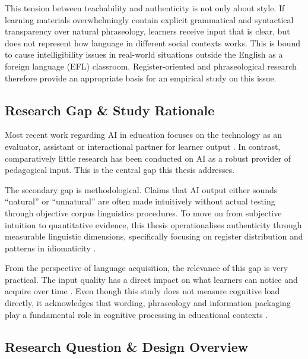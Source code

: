 \documentclass[11pt,a4paper]{article}
\begin{document}
This tension between teachability and authenticity is not only about style. If learning materials overwhelmingly contain explicit grammatical and syntactical transparency over natural phraseology, learners receive input that is clear, but does not represent how language in different social contexts works. This is bound to cause intelligibility issues in real-world situations outside the English as a foreign language (EFL) classroom. Register-oriented \parencite{biber1988variation, leFoll2021b} and phraseological research \parencite{sinclairCorpusConcordanceCollocation1991} therefore provide an appropriate basis for an empirical study on this issue.

\subsection{Research Gap \& Study Rationale}

Most recent work regarding AI in education focuses on the technology as an evaluator, assistant or interactional partner for learner output \parencite{holmesArtificialIntelligenceEducation2019}. In contrast, comparatively little research has been conducted on AI as a robust provider of pedagogical input. This is the central gap this thesis addresses.

The secondary gap is methodological. Claims that AI output either sounds ``natural'' or ``unnatural'' are often made intuitively without actual testing through objective corpus linguistics procedures. To move on from subjective intuition to quantitative evidence, this thesis operationalises authenticity through measurable linguistic dimensions, specifically focusing on register distribution \parencite{biber1988variation} and patterns in idiomaticity \parencite{sinclairCorpusConcordanceCollocation1991}.

From the perspective of language acquisition, the relevance of this gap is very practical. The input quality has a direct impact on what learners can notice and acquire over time \parencite{krashenInputHypothesisIssues1985}. Even though this study does not measure cognitive load directly, it acknowledges that wording, phraseology and information packaging play a fundamental role in cognitive processing in educational contexts \parencite{spiroCognitiveFlexibility1992, swellerCognitiveLoadProblem1988a}.

\subsection{Research Question \& Design Overview}
\end{document}
